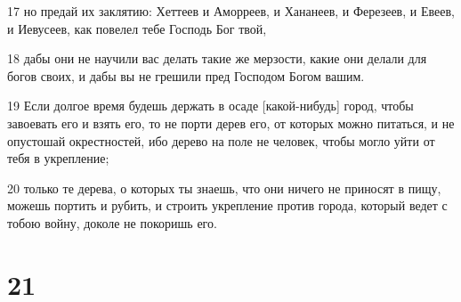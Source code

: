 \par 17 но предай их заклятию: Хеттеев и Аморреев, и Хананеев, и Ферезеев, и Евеев, и Иевусеев, как повелел тебе Господь Бог твой,
\par 18 дабы они не научили вас делать такие же мерзости, какие они делали для богов своих, и дабы вы не грешили пред Господом Богом вашим.
\par 19 Если долгое время будешь держать в осаде [какой-нибудь] город, чтобы завоевать его и взять его, то не порти дерев его, от которых можно питаться, и не опустошай окрестностей, ибо дерево на поле не человек, чтобы могло уйти от тебя в укрепление;
\par 20 только те дерева, о которых ты знаешь, что они ничего не приносят в пищу, можешь портить и рубить, и строить укрепление против города, который ведет с тобою войну, доколе не покоришь его.

\chapter{21}

